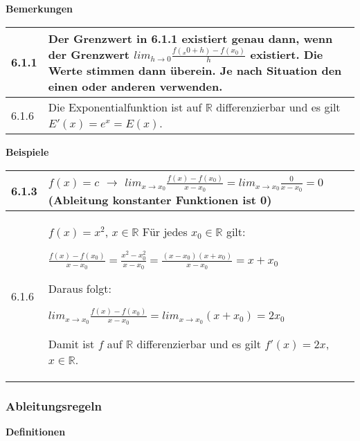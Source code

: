     \noindent
    \textbf{Bemerkungen}
    \begin{table}[H]
    \begin{tabularx}{\textwidth}{X m{16cm}}
        \toprule

        6.1.1 & Der Grenzwert in 6.1.1 existiert genau dann, wenn der Grenzwert $lim_{h \rightarrow 0} \frac{f(_x0 + h)-f(x_0)}{h}$
                existiert. Die Werte stimmen dann überein. Je nach Situation den einen oder anderen verwenden. \\
        \midrule
        6.1.6 & Die Exponentialfunktion ist auf $\mathbb{R}$ differenzierbar und es gilt $E'(x) = e^x = E(x)$. \\

        \bottomrule
    \end{tabularx}
    \end{table}

    \noindent
    \textbf{Beispiele}
    \begin{table}[H]
    \begin{tabularx}{\textwidth}{X m{16cm}}
        \toprule

        6.1.3 & $f(x) = c$ $\rightarrow$ $lim_{x \rightarrow x_0} \frac{f(x)-f(x_0)}{x-x_0} = lim_{x \rightarrow x_0}
                                \frac{0}{x-x_0} = 0$ (Ableitung konstanter Funktionen ist 0) \\
        \midrule
        6.1.6 & $f(x) = x^2$, $x \in \mathbb{R}$ \hfill \break
                Für jedes $x_0 \in \mathbb{R}$ gilt: \hfill \break
                \centerline{$\frac{f(x)-f(x_0)}{x-x_0}= \frac{x^2-x_0^2}{x-x_0} = \frac{(x-x_0)(x+x_0)}{x-x_0} = x+x_0$}
                Daraus folgt: \hfill \break
                \centerline{$lim_{x \rightarrow x_0} \frac{f(x)-f(x_0)}{x-x_0} = lim_{x \rightarrow x_0}(x+x_0) = 2x_0$}
                Damit ist $f$ auf $\mathbb{R}$ differenzierbar und es gilt $f'(x) = 2x$, $x \in \mathbb{R}$. \\
        \midrule
                 


        \bottomrule
    \end{tabularx}
    \end{table}

\subsubsection{Ableitungsregeln}

    \noindent
    \textbf{Definitionen}
    \begin{table}[H]  
    \begin{tabularx}{\textwidth}{X m{16cm}}
        \toprule

        & \\

        \bottomrule

    \end{tabularx}
    \end{table}

